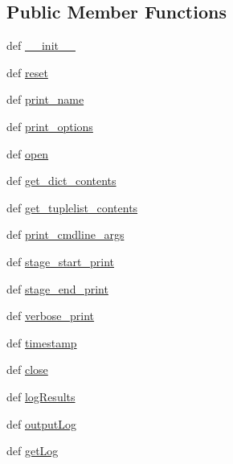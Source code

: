 \subsection*{Public Member Functions}
\begin{DoxyCompactItemize}
\item 
def \hyperlink{class_logger_1_1_logger_aff6a8050c4529cf59be26d70e487aba9}{\-\_\-\-\_\-init\-\_\-\-\_\-}
\item 
def \hyperlink{class_logger_1_1_logger_a13e2a87babf570a4524a9a0e505ba396}{reset}
\item 
def \hyperlink{class_logger_1_1_logger_a3ec2e17d92bb034c1e4f1e11ec7c2522}{print\-\_\-name}
\item 
def \hyperlink{class_logger_1_1_logger_aa6ca87386f752414ada5cc84daa1bfd4}{print\-\_\-options}
\item 
def \hyperlink{class_logger_1_1_logger_a009dfacca4ae352cc05a7e8307d8ecb5}{open}
\item 
def \hyperlink{class_logger_1_1_logger_a10141d585df905bec94bedf85a8eb976}{get\-\_\-dict\-\_\-contents}
\item 
def \hyperlink{class_logger_1_1_logger_a51264c10e6b8e89921d3e9f1f803a350}{get\-\_\-tuplelist\-\_\-contents}
\item 
def \hyperlink{class_logger_1_1_logger_a3779c396f867ec4bd7ec73864990e8de}{print\-\_\-cmdline\-\_\-args}
\item 
def \hyperlink{class_logger_1_1_logger_a10165baedbbebdc49c449237e518edb8}{stage\-\_\-start\-\_\-print}
\item 
def \hyperlink{class_logger_1_1_logger_a2f203cbc01e4de98b5eab3e5c9d9709f}{stage\-\_\-end\-\_\-print}
\item 
def \hyperlink{class_logger_1_1_logger_a8c05e25fb36679fae21ab8910eb6d117}{verbose\-\_\-print}
\item 
def \hyperlink{class_logger_1_1_logger_abdeac14fe7d313f6a4d2788ec7652ce2}{timestamp}
\item 
def \hyperlink{class_logger_1_1_logger_a8ee3d433a755c789820bd9188824debc}{close}
\item 
def \hyperlink{class_logger_1_1_logger_a119a7a5e59e77d9cced01057bdd8d493}{log\-Results}
\item 
def \hyperlink{class_logger_1_1_logger_ac50b7479c5c0f15b94ae311774600cd7}{output\-Log}
\item 
def \hyperlink{class_logger_1_1_logger_af565e7da19e56f4f4ff0e1f88b172394}{get\-Log}
\end{DoxyCompactItemize}
